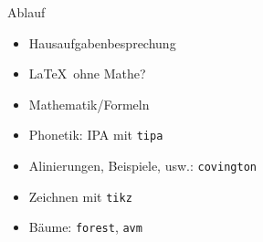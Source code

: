 \begin{frame}[fragile]{Ablauf}
    \begin{itemize}[<+->]
        \item Hausaufgabenbesprechung
        \item \LaTeX\ ohne Mathe?
        \item Mathematik/Formeln
        \item Phonetik: IPA mit \texttt{tipa}
        \item Alinierungen, Beispiele, usw.: \texttt{covington}
        \item Zeichnen mit \texttt{tikz}
        \item Bäume: \texttt{forest}, \texttt{avm}
    \end{itemize}
\end{frame}
